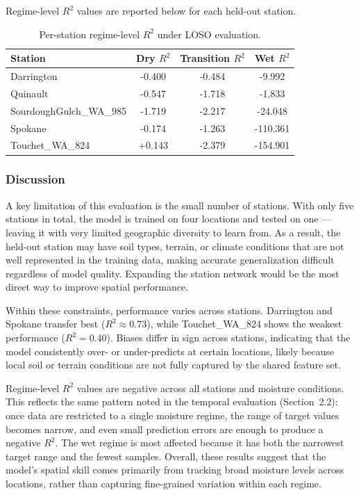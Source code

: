 Regime-level $R^2$ values are reported below for each held-out station.

\begin{table}[H]
\centering
\begin{tabular}{lccc}
\toprule
\textbf{Station} & \textbf{Dry $R^2$} & \textbf{Transition $R^2$} & \textbf{Wet $R^2$} \\
\midrule
Darrington              & -0.400 & -0.484  &   -9.992 \\
Quinault                & -0.547 & -1.718  &   -1.833 \\
SourdoughGulch\_WA\_985 & -1.719 & -2.217  &  -24.048 \\
Spokane                 & -0.174 & -1.263  & -110.361 \\
Touchet\_WA\_824        & +0.143 & -2.379  & -154.901 \\
\bottomrule
\end{tabular}
\caption{Per-station regime-level $R^2$ under LOSO evaluation.}
\end{table}

\subsubsection*{Discussion}
A key limitation of this evaluation is the small number of stations. With only five stations
in total, the model is trained on four locations and tested on one — leaving it with very
limited geographic diversity to learn from. As a result, the held-out station may have soil
types, terrain, or climate conditions that are not well represented in the training data,
making accurate generalization difficult regardless of model quality. Expanding the station
network would be the most direct way to improve spatial performance.

Within these constraints, performance varies across stations. Darrington and Spokane transfer
best ($R^2 \approx 0.73$), while Touchet\_WA\_824 shows the weakest performance
($R^2 = 0.40$). Biases differ in sign across stations, indicating that the model
consistently over- or under-predicts at certain locations, likely because local soil or
terrain conditions are not fully captured by the shared feature set.

Regime-level $R^2$ values are negative across all stations and moisture conditions. This
reflects the same pattern noted in the temporal evaluation (Section~2.2): once data are
restricted to a single moisture regime, the range of target values becomes narrow, and even
small prediction errors are enough to produce a negative $R^2$. The wet regime is most
affected because it has both the narrowest target range and the fewest samples. Overall,
these results suggest that the model's spatial skill comes primarily from tracking broad
moisture levels across locations, rather than capturing fine-grained variation within each
regime.
